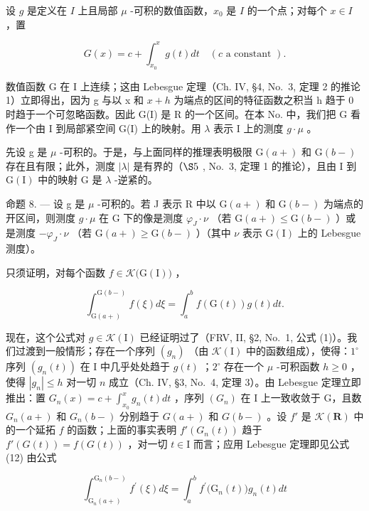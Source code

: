 设 \(g\) 是定义在 \(I\) 上且局部 \(\mu\) -可积的数值函数，\(x_0\) 是 \(I\) 的一个点；对每个 \(x \in I\) ，置

\[
G (x) = c + \int_ {x _ {0}} ^ {x} g (t) d t \quad (c \text {   a   constant }).\tag{11}
\]

数值函数 G 在 I 上连续；这由 Lebesgue 定理（Ch. IV, §4, No.~3, 定理 2 的推论 1）立即得出，因为 g 与以 x 和 \(x + h\) 为端点的区间的特征函数之积当 h 趋于 0 时趋于一个可忽略函数。因此 G(I) 是 R 的一个区间。在本 No. 中，我们把 G 看作一个由 I 到局部紧空间 G(I) 上的映射。用 \(\lambda\) 表示 I 上的测度 \(g \cdot \mu\) 。

先设 g 是 \(\mu\) -可积的。于是，与上面同样的推理表明极限 \(\mathrm{G}(a+)\) 和 \(\mathrm{G}(b-)\) 存在且有限；此外，测度 \(|\lambda|\) 是有界的（\(\S5\) , No.~3, 定理 1 的推论），且由 I 到 \(\mathrm{G}(\mathrm{I})\) 中的映射 G 是 \(\lambda\) -逆紧的。

命题 8. --- 设 g 是 \(\mu\) -可积的。若 J 表示 R 中以 \(\mathrm{G}(a+)\) 和 \(\mathrm{G}(b-)\) 为端点的开区间，则测度 \(g \cdot \mu\) 在 G 下的像是测度 \(\varphi_{J} \cdot \nu\) （若 \(\mathrm{G}(a+) \leqslant \mathrm{G}(b-)\) ）或是测度 \(-\varphi_{J} \cdot \nu\) （若 \(\mathrm{G}(a+) \geqslant \mathrm{G}(b-)\) ）（其中 \(\nu\) 表示 \(\mathrm{G}(\mathrm{I})\) 上的 Lebesgue 测度）。

只须证明，对每个函数 \(f \in \mathcal{K}\big(\mathrm{G}(\mathrm{I})\big)\) ，

\[
\int_ {\mathrm{G} (a +)} ^ {\mathrm{G} (b -)} f (\xi) d \xi = \int_ {a} ^ {b} f (\mathrm{G} (t)) g (t) d t.\tag{12}
\]

现在，这个公式对 \(g \in \mathcal{K}(\mathrm{I})\) 已经证明过了（FRV, II, §2, No.~1, 公式 (1)）。我们过渡到一般情形；存在一个序列 \((g_n)\) （由 \(\mathcal{K}(\mathrm{I})\) 中的函数组成），使得：\(1^\circ\) 序列 \((g_n(t))\) 在 I 中几乎处处趋于 \(g(t)\) ；\(2^\circ\) 存在一个 \(\mu\) -可积函数 \(h \geqslant 0\) ，使得 \(|g_n| \leqslant h\) 对一切 \(n\) 成立（Ch. IV, §3, No.~4, 定理 3）。由 Lebesgue 定理立即推出：置 \(G_n(x) = c + \int_{x_0}^x g_n(t) dt\) ，序列 \((G_n)\) 在 I 上一致收敛于 G，且数 \(G_n(a+)\) 和 \(G_n(b-)\) 分别趋于 \(G(a+)\) 和 \(G(b-)\) 。设 \(f'\) 是 \(\mathcal{K}(\mathbf{R})\) 中的一个延拓 \(f\) 的函数；上面的事实表明 \(f'(G_n(t))\) 趋于 \(f'(G(t)) = f(G(t))\) ，对一切 \(t \in \mathrm{I}\) 而言；应用 Lebesgue 定理即见公式 (12) 由公式

\[
\int_ {\mathrm{G} _ {n} (a +)} ^ {\mathrm{G} _ {n} (b -)} f ^ {\prime} (\xi) d \xi = \int_ {a} ^ {b} f ^ {\prime} \bigl (\mathrm{G} _ {n} (t) \bigr) g _ {n} (t) d t
\]

